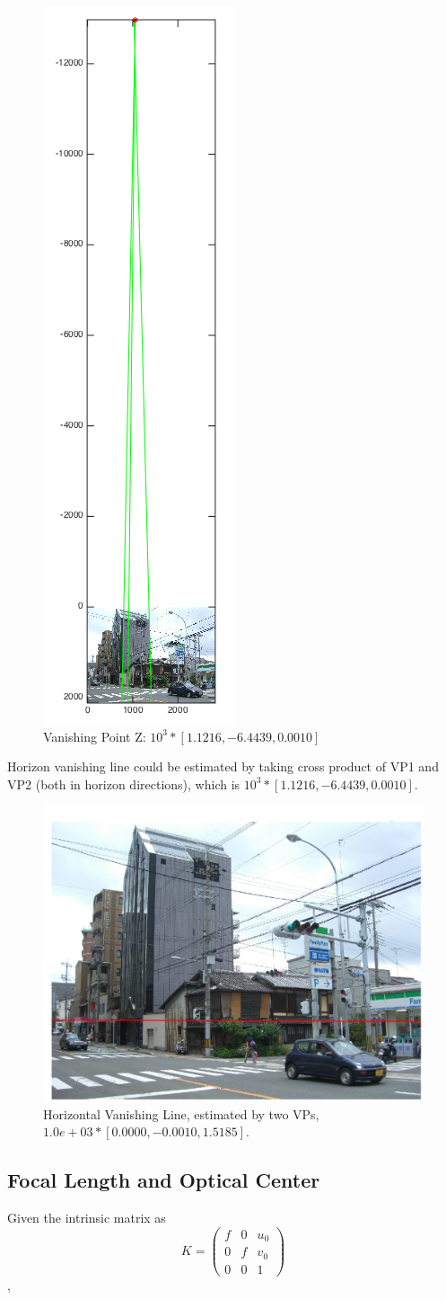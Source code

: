 \documentclass[11pt]{article}
\begin{document}
\begin{figure}[htb]
\begin{center}
\includegraphics[height=0.5\linewidth]{vp3.png}
\caption{Vanishing Point Z: $10^3 * [1.1216, -6.4439, 0.0010]$}
\label{fig:vp3}
\end{center}
\end{figure}

Horizon vanishing line could be estimated by taking cross product of VP1 and VP2 (both in horizon directions), which is $10^3 * [1.1216, -6.4439, 0.0010]$.

\begin{figure}[htb]
\begin{center}
\includegraphics[height=0.6\linewidth]{hvline.png}
\caption{Horizontal Vanishing Line, estimated by two VPs, $1.0e+03 * [0.0000, -0.0010, 1.5185]$.}
\label{fig:hvline}
\end{center}
\end{figure}

\subsection{Focal Length and Optical Center}
Given the intrinsic matrix as 
\[
K = \left( \begin{array}{ccc}
f & 0 & u_0 \\
0 & f & v_0 \\
0 & 0 & 1  \end{array} \right)
\],
\end{document}
